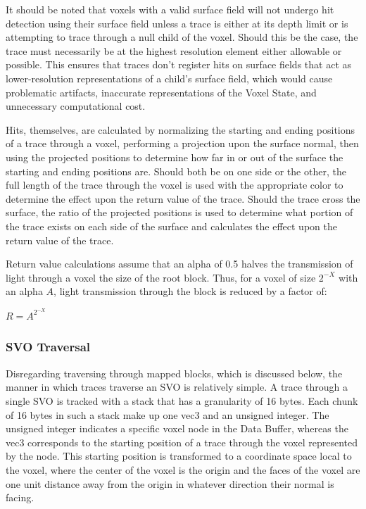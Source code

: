 \documentclass[onecolumn, draftclsnofoot,10pt, compsoc]{IEEEtran}
\begin{document}
It should be noted that voxels with a valid surface field will not undergo hit detection using their surface field unless a trace is either at its depth limit or is attempting to trace through a null child of the voxel. Should this be the case, the trace must necessarily be at the highest resolution element either allowable or possible. This ensures that traces don’t register hits on surface fields that act as lower-resolution representations of a child’s surface field, which would cause problematic artifacts, inaccurate representations of the Voxel State, and unnecessary computational cost.

Hits, themselves, are calculated by normalizing the starting and ending positions of a trace through a voxel, performing a projection upon the surface normal, then using the projected positions to determine how far in or out of the surface the starting and ending positions are. Should both be on one side or the other, the full length of the trace through the voxel is used with the appropriate color to determine the effect upon the return value of the trace. Should the trace cross the surface, the ratio of the projected positions is used to determine what portion of the trace exists on each side of the surface and calculates  the effect upon the return value of the trace.

Return value calculations assume that an alpha of 0.5 halves the transmission of light through a voxel the size of the root block. Thus, for a voxel of size $2^{-X}$ with an alpha $A$, light transmission through the block is reduced by a factor of:

\begin{center}
$R = A^{2^{-X}}$
\end{center}

\subsubsection{SVO Traversal}

Disregarding traversing through mapped blocks, which is discussed below, the manner in which traces traverse an SVO is relatively simple. A trace through a single SVO is tracked with a stack that has a granularity of 16 bytes. Each chunk of 16 bytes in such a stack make up one vec3 and an unsigned integer. The unsigned integer indicates a specific voxel node in the Data Buffer, whereas the vec3 corresponds to the starting position of a trace through the voxel represented by the node. This starting position is transformed to a coordinate space local to the voxel, where the center of the voxel is the origin and the faces of the voxel are one unit distance away from the origin in whatever direction their normal is facing.
\end{document}
